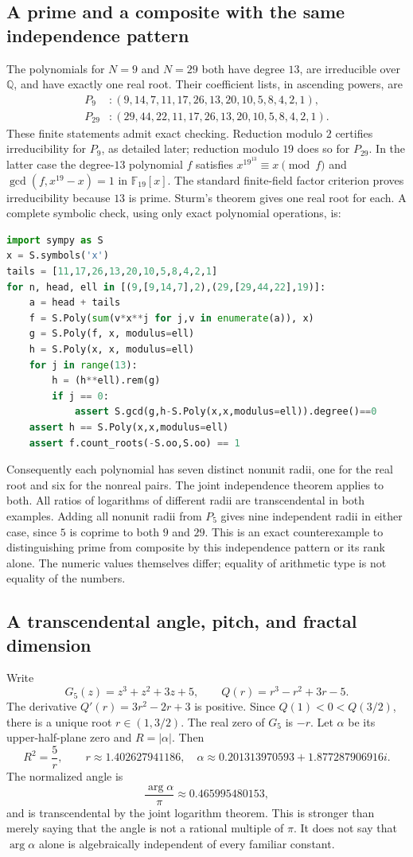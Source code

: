 \documentclass[11pt,a4paper]{article}
\theoremstyle{definition}
\theoremstyle{remark}
\numberwithin{equation}{section}
\begin{document}
\subsection{A prime and a composite with the same independence pattern}
The polynomials for $N=9$ and $N=29$ both have degree $13$, are
irreducible over $\mathbb Q$, and have exactly one real root. Their
coefficient lists, in ascending powers, are
\[
\begin{split}
 P_9 &: (9,14,7,11,17,26,13,20,10,5,8,4,2,1),\\
 P_{29} &: (29,44,22,11,17,26,13,20,10,5,8,4,2,1).
\end{split}
\]
These finite statements admit exact checking. Reduction modulo $2$
certifies irreducibility for $P_9$, as detailed later; reduction modulo
$19$ does so for $P_{29}$. In the latter case the degree-$13$ polynomial
$f$ satisfies $x^{19^{13}}\equiv x\pmod f$ and
$\gcd(f,x^{19}-x)=1$ in $\mathbb F_{19}[x]$. The standard finite-field
factor criterion proves irreducibility because $13$ is prime.
Sturm's theorem gives one real root for each. A complete symbolic
check, using only exact polynomial operations, is:
\begin{lstlisting}[language=Python]
import sympy as S
x = S.symbols('x')
tails = [11,17,26,13,20,10,5,8,4,2,1]
for n, head, ell in [(9,[9,14,7],2),(29,[29,44,22],19)]:
    a = head + tails
    f = S.Poly(sum(v*x**j for j,v in enumerate(a)), x)
    g = S.Poly(f, x, modulus=ell)
    h = S.Poly(x, x, modulus=ell)
    for j in range(13):
        h = (h**ell).rem(g)
        if j == 0:
            assert S.gcd(g,h-S.Poly(x,x,modulus=ell)).degree()==0
    assert h == S.Poly(x,x,modulus=ell)
    assert f.count_roots(-S.oo,S.oo) == 1
\end{lstlisting}
Consequently each polynomial has seven distinct nonunit radii, one
for the real root and six for the nonreal pairs. The joint independence
theorem applies to both. All ratios of logarithms of different radii
are transcendental in both examples. Adding all nonunit radii from
$P_5$ gives nine independent radii in either case, since $5$ is coprime
to both $9$ and $29$. This is an exact counterexample to distinguishing
prime from composite by this independence pattern or its rank alone.
The numeric values themselves differ; equality of arithmetic type is
not equality of the numbers.

\subsection{A transcendental angle, pitch, and fractal dimension}
Write
\[
 G_5(z)=z^3+z^2+3z+5,
 \qquad Q(r)=r^3-r^2+3r-5.
\]
The derivative $Q'(r)=3r^2-2r+3$ is positive. Since $Q(1)<0<Q(3/2)$,
there is a unique root $r\in(1,3/2)$. The real zero of $G_5$ is $-r$.
Let $\alpha$ be its upper-half-plane zero and $R=|\alpha|$. Then
\[
 R^2=\frac5r,\qquad
 r\approx1.402627941186,
 \quad\alpha\approx0.201313970593+1.877287906916i.
\]
The normalized angle is
\[
 \frac{\arg\alpha}{\pi}\approx0.465995480153,
\]
and is transcendental by the joint logarithm theorem. This is stronger
than merely saying that the angle is not a rational multiple of $\pi$.
It does not say that $\arg\alpha$ alone is algebraically independent
of every familiar constant.
\end{document}
